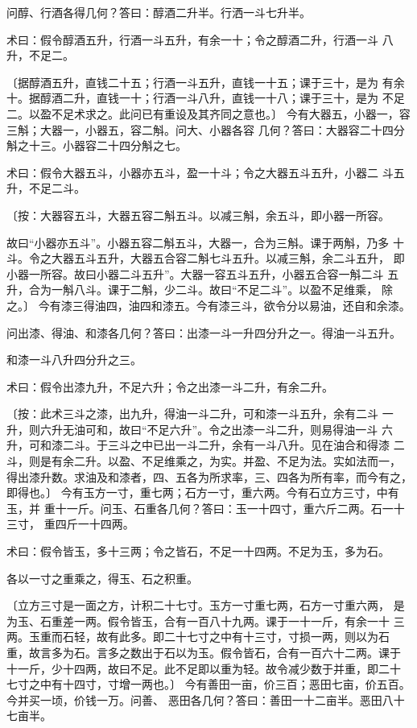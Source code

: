 \documentclass[a4paper,12pt,UTF8,twoside]{ctexbook}
\begin{document}
问醇、行酒各得几何？答曰：醇酒二升半。行洒一斗七升半。

术曰：假令醇酒五升，行酒一斗五升，有余一十；令之醇酒二升，行酒一斗 八升，不足二。

〔据醇酒五升，直钱二十五；行酒一斗五升，直钱一十五；课于三十，是为 有余十。据醇酒二升，直钱一十；行酒一斗八升，直钱一十八；课于三十，是为 不足二。以盈不足术求之。此问已有重设及其齐同之意也。〕 今有大器五，小器一，容三斛；大器一，小器五，容二斛。问大、小器各容 几何？答曰：大器容二十四分斛之十三。小器容二十四分斛之七。

术曰：假令大器五斗，小器亦五斗，盈一十斗；令之大器五斗五升，小器二 斗五升，不足二斗。

〔按：大器容五斗，大器五容二斛五斗。以减三斛，余五斗，即小器一所容。

故曰“小器亦五斗”。小器五容二斛五斗，大器一，合为三斛。课于两斛，乃多 十斗。令之大器五斗五升，大器五合容二斛七斗五升。以减三斛，余二斗五升， 即小器一所容。故曰小器二斗五升”。大器一容五斗五升，小器五合容一斛二斗 五升，合为一斛八斗。课于二斛，少二斗。故曰“不足二斗”。以盈不足维乘， 除之。〕 今有漆三得油四，油四和漆五。今有漆三斗，欲令分以易油，还自和余漆。

问出漆、得油、和漆各几何？答曰：出漆一斗一升四分升之一。得油一斗五升。

和漆一斗八升四分升之三。

术曰：假令出漆九升，不足六升；令之出漆一斗二升，有余二升。

〔按：此术三斗之漆，出九升，得油一斗二升，可和漆一斗五升，余有二斗 一升，则六升无油可和，故曰“不足六升”。令之出漆一斗二升，则易得油一斗 六升，可和漆二斗。于三斗之中已出一斗二升，余有一斗八升。见在油合和得漆 二斗，则是有余二升。以盈、不足维乘之，为实。并盈、不足为法。实如法而一， 得出漆升数。求油及和漆者，四、五各为所求率，三、四各为所有率，而今有之， 即得也。〕 今有玉方一寸，重七两；石方一寸，重六两。今有石立方三寸，中有玉，并 重十一斤。问玉、石重各几何？答曰：玉一十四寸，重六斤二两。石一十三寸， 重四斤一十四两。

术曰：假令皆玉，多十三两；令之皆石，不足一十四两。不足为玉，多为石。

各以一寸之重乘之，得玉、石之积重。

〔立方三寸是一面之方，计积二十七寸。玉方一寸重七两，石方一寸重六两， 是为玉、石重差一两。假令皆玉，合有一百八十九两。课于一十一斤，有余一十 三两。玉重而石轻，故有此多。即二十七寸之中有十三寸，寸损一两，则以为石 重，故言多为石。言多之数出于石以为玉。假令皆石，合有一百六十二两。课于 十一斤，少十四两，故曰不足。此不足即以重为轻。故令减少数于并重，即二十 七寸之中有十四寸，寸增一两也。〕 今有善田一亩，价三百；恶田七亩，价五百。今并买一顷，价钱一万。问善、 恶田各几何？答曰：善田一十二亩半。恶田八十七亩半。
\end{document}
